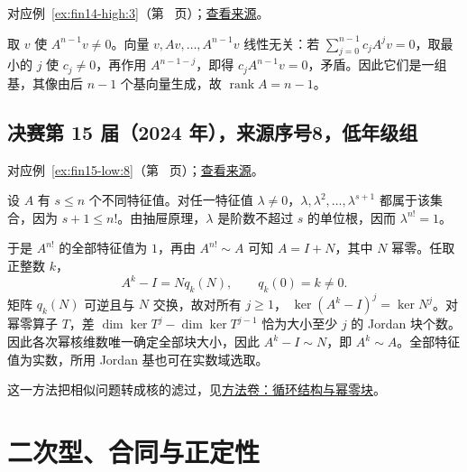 \documentclass[12pt,fontset=fandol]{ctexart}
\begin{document}
对应例~\ref{ex:fin14-high:3}（第~\pageref{ex:fin14-high:3} 页）；\href{https://github.com/lzxcr/cmc-mathematics/blob/64916fa1fdbc3e444a652eca204d5669058ee321/src/problems/finals/14/03.md}{查看来源}。

\begin{solve}

取 $v$ 使 $A^{n-1}v\ne0$。向量 $v,Av,\dots,A^{n-1}v$ 线性无关：若 $\sum_{j=0}^{n-1}c_jA^jv=0$，取最小的 $j$ 使 $c_j\ne0$，再作用 $A^{n-1-j}$，即得 $c_jA^{n-1}v=0$，矛盾。因此它们是一组基，其像由后 $n-1$ 个基向量生成，故 $\boxed{\operatorname{rank}A=n-1}$。

\end{solve}

\subsection{决赛第 15 届（2024 年），来源序号8，低年级组}\label{ans:fin15-low:8}\label{pr:fin15-low:8}

对应例~\ref{ex:fin15-low:8}（第~\pageref{ex:fin15-low:8} 页）；\href{https://github.com/lzxcr/cmc-mathematics/blob/64916fa1fdbc3e444a652eca204d5669058ee321/src/problems/finals/15/08.md}{查看来源}。

\begin{solve}

设 $A$ 有 $s\le n$ 个不同特征值。对任一特征值 $\lambda\ne0$，$\lambda,\lambda^2,\dots,\lambda^{s+1}$ 都属于该集合，因为 $s+1\le n!$。由抽屉原理，$\lambda$ 是阶数不超过 $s$ 的单位根，因而 $\lambda^{n!}=1$。

于是 $A^{n!}$ 的全部特征值为 $1$，再由 $A^{n!}\sim A$ 可知 $A=I+N$，其中 $N$ 幂零。任取正整数 $k$，
\[
A^k-I=Nq_k(N),\qquad q_k(0)=k\ne0.
\]
矩阵 $q_k(N)$ 可逆且与 $N$ 交换，故对所有 $j\ge1$，
$\ker(A^k-I)^j=\ker N^j$。对幂零算子 $T$，差 $\dim\ker T^j-\dim\ker T^{j-1}$ 恰为大小至少 $j$ 的 Jordan 块个数。因此各次幂核维数唯一确定全部块大小，因此 $A^k-I\sim N$，即 $A^k\sim A$。全部特征值为实数，所用 Jordan 基也可在实数域选取。

这一方法把相似问题转成核的滤过，见\hyperref[app:linear-cyclic]{方法卷：循环结构与幂零块}。

\end{solve}

\section{二次型、合同与正定性}

\label{sec:solutions-7}
\end{document}
